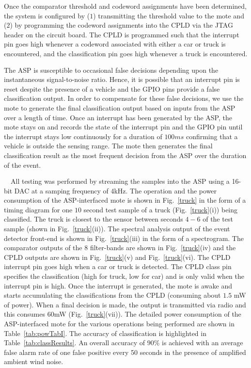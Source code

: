 Once the comparator threshold and codeword assignments have been determined, the system is configured by ($1$) transmitting the threshold value to the mote and ($2$) by programming the codeword assignments into the CPLD via the JTAG header on the circuit board.  The CPLD is programmed such that the interrupt pin goes high whenever a codeword associated with either a car or truck is encountered, and the classification pin goes high whenever a truck is encountered.  

The ASP is susceptible to occasional false decisions depending upon the instantaneous signal-to-noise ratio. Hence, it is possible that an interrupt pin is reset despite the presence of a vehicle and the GPIO pins provide a false classification output. In order to compensate for these false decisions, we use the mote to generate the final classification output based on inputs from the ASP over a length of time. Once an interrupt has been generated by the ASP, the mote stays on and records the state of the interrupt pin and the GPIO pin until the interrupt stays low continuously for a duration of $100ms$ confirming that a vehicle is outside the sensing range. The mote then generates the final classification result as the most frequent decision from the ASP over the duration of the event.

~~All testing was performed by streaming the samples into the ASP using a 16-bit DAC at a samping frequency of 4kHz.  The operation and the power consumption of the ASP-interfaced mote is shown in Fig.~\ref{truck} in the form of a timing diagram for one  $10$ second test sample of a truck (Fig.~\ref{truck}(i)) being classified. The truck is closest to the sensor between seconds $4-6$ of the test sample (shown in Fig.~\ref{truck}(ii)). The spectral analysis output of the event detector front-end is shown in Fig.~\ref{truck}(iii) in the form of a spectrogram.  The comparator outputs of the $8$ filter-bands are shown in Fig.~\ref{truck}(iv) and the CPLD outputs are shown in Fig.~\ref{truck}(v) and Fig.~\ref{truck}(vi). The CPLD interrupt pin goes high when a car or truck is detected. The CPLD class pin specifies the classification (high for truck, low for car) and is only valid when the interrupt pin is high. Once the interrupt is generated, the mote is awake and starts accumulating the classifications from the CPLD (consuming about $1.5$ mW of power). When a final decision is made, the output is transmitted via radio and this consumes $60$mW (Fig.~\ref{truck}(vii)). The detailed power consumption of the ASP-interfaced mote for the various operations being performed are shown in Table~\ref{tab:powTabI}. The accuracy of classification is highlighted in Table~\ref{tab:classResults}. An overall accuracy of $90\%$ is achieved with an average false alarm rate of one false positive every 50 seconds in the presence of amplified ambient wind noise.







